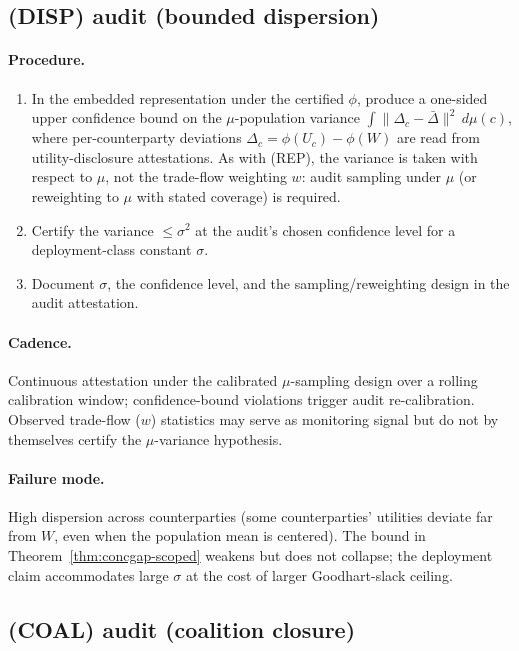 \subsection{(DISP) audit (bounded dispersion)}

\paragraph{Procedure.}
\begin{enumerate}
\item In the embedded representation under the certified $\phi$,
  produce a one-sided upper confidence bound on the
  $\mu$-population variance $\int \|\Delta_c -
  \bar\Delta\|^2 \,d\mu(c)$, where per-counterparty deviations
  $\Delta_c = \phi(U_c) - \phi(W)$ are read from
  utility-disclosure attestations. As with (REP), the variance is
  taken with respect to $\mu$, not the trade-flow weighting $w$:
  audit sampling under $\mu$ (or reweighting to $\mu$ with stated
  coverage) is required.
\item Certify the variance $\leq \sigma^2$ at the audit's chosen
  confidence level for a deployment-class constant $\sigma$.
\item Document $\sigma$, the confidence level, and the
  sampling/reweighting design in the audit attestation.
\end{enumerate}

\paragraph{Cadence.} Continuous attestation under the calibrated
$\mu$-sampling design over a rolling calibration window;
confidence-bound violations trigger audit re-calibration. Observed
trade-flow ($w$) statistics may serve as monitoring signal but do
not by themselves certify the $\mu$-variance hypothesis.

\paragraph{Failure mode.} High dispersion across counterparties
(some counterparties' utilities deviate far from $W$, even when
the population mean is centered). The bound in
Theorem~\ref{thm:concgap-scoped} weakens but does not collapse;
the deployment claim accommodates large $\sigma$ at the cost of
larger Goodhart-slack ceiling.

\subsection{(COAL) audit (coalition closure)}


